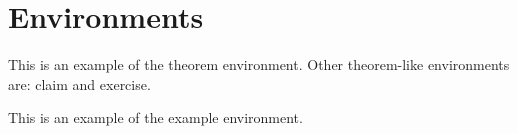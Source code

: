 \documentclass[11pt]{article}
\begin{document}
\draft

\section{Environments}

\begin{theorem}
This is an example of the theorem environment.
Other theorem-like environments are: claim and exercise.
\end{theorem}
\begin{example}
This is an example of the example environment.
\end{example}



\end{document}
